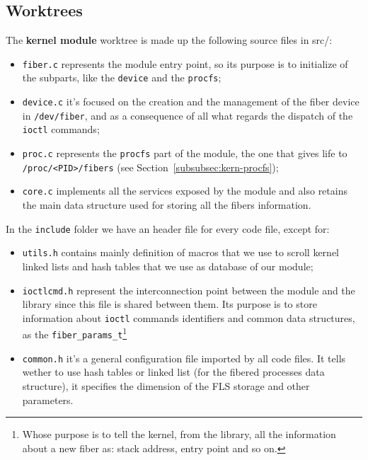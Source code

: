 \documentclass[a4paper,10pt]{article}
\begin{document}
\subsection{Worktrees}
The \textbf{kernel module} worktree is made up the following source files in src/:
\begin{itemize}
	\item \lstinline{fiber.c} represents the module entry point, so its purpose is to initialize of the subparts, like the \lstinline{device} and the \lstinline{procfs};
	\item \lstinline{device.c} it's focused on the creation and the management of the fiber device in \lstinline{/dev/fiber}, and as a consequence of all what regards the dispatch of the \lstinline{ioctl} commands;
	\item \lstinline{proc.c} represents the \lstinline{procfs} part of the module, the one that gives life to \lstinline{/proc/<PID>/fibers} (see Section~\ref{subsubsec:kern-procfs});
	\item \lstinline{core.c} implements all the services exposed by the module and also retains the main data structure used for storing all the fibers information.
\end{itemize}
In the \lstinline{include} folder we have an header file for every code file, except for:
\begin{itemize}
	\item \lstinline{utils.h} contains mainly definition of macros that we use to scroll kernel linked lists and hash tables that we use as database of our module;
	\item \lstinline{ioctlcmd.h} represent the interconnection point between the module and the library since this file is shared between them. Its purpose is to store information about \lstinline{ioctl} commands identifiers and common data structures, as the \lstinline{fiber_params_t}\footnote{Whose purpose is to tell the kernel, from the library, all the information about a new fiber as: stack address, entry point and so on.}
	\item \lstinline{common.h} it's a general configuration file imported by all code files. It tells wether to use hash tables or linked list (for the fibered processes data structure), it specifies the dimension of the FLS storage and other parameters.
\end{itemize}
\end{document}
